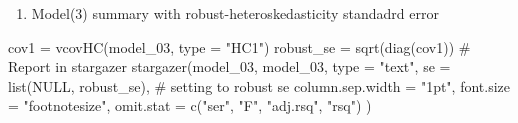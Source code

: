 \documentclass[
  letterpaper,
  DIV=11,
  numbers=noendperiod]{scrartcl}
\newenvironment{Shaded}{\begin{snugshade}}{\end{snugshade}}
\newcommand{\AttributeTok}[1]{\textcolor[rgb]{0.40,0.45,0.13}{#1}}
\newcommand{\CommentTok}[1]{\textcolor[rgb]{0.37,0.37,0.37}{#1}}
\newcommand{\ConstantTok}[1]{\textcolor[rgb]{0.56,0.35,0.01}{#1}}
\newcommand{\FunctionTok}[1]{\textcolor[rgb]{0.28,0.35,0.67}{#1}}
\newcommand{\NormalTok}[1]{\textcolor[rgb]{0.00,0.23,0.31}{#1}}
\newcommand{\OtherTok}[1]{\textcolor[rgb]{0.00,0.23,0.31}{#1}}
\newcommand{\StringTok}[1]{\textcolor[rgb]{0.13,0.47,0.30}{#1}}
\providecommand{\tightlist}{%
  \setlength{\itemsep}{0pt}\setlength{\parskip}{0pt}}\usepackage{longtable,booktabs,array}
\begin{document}
\begin{enumerate}
\def\labelenumi{\arabic{enumi}.}
\setcounter{enumi}{8}
\tightlist
\item
  Model(3) summary with robust-heteroskedasticity standadrd error
\end{enumerate}

\begin{Shaded}
\begin{Highlighting}[]
\NormalTok{cov1 }\OtherTok{=} \FunctionTok{vcovHC}\NormalTok{(model\_03, }\AttributeTok{type =} \StringTok{"HC1"}\NormalTok{)}
\NormalTok{robust\_se }\OtherTok{=} \FunctionTok{sqrt}\NormalTok{(}\FunctionTok{diag}\NormalTok{(cov1))}
\CommentTok{\# Report in stargazer}
\FunctionTok{stargazer}\NormalTok{(model\_03, model\_03, }
          \AttributeTok{type =} \StringTok{"text"}\NormalTok{,}
          \AttributeTok{se =} \FunctionTok{list}\NormalTok{(}\ConstantTok{NULL}\NormalTok{, robust\_se), }\CommentTok{\# setting to robust se}
          \AttributeTok{column.sep.width =} \StringTok{"1pt"}\NormalTok{,}
          \AttributeTok{font.size =} \StringTok{"footnotesize"}\NormalTok{,}
          \AttributeTok{omit.stat =} \FunctionTok{c}\NormalTok{(}\StringTok{"ser"}\NormalTok{, }\StringTok{"F"}\NormalTok{, }\StringTok{"adj.rsq"}\NormalTok{, }\StringTok{"rsq"}\NormalTok{)}
\NormalTok{          )}
\end{Highlighting}
\end{Shaded}
\end{document}
